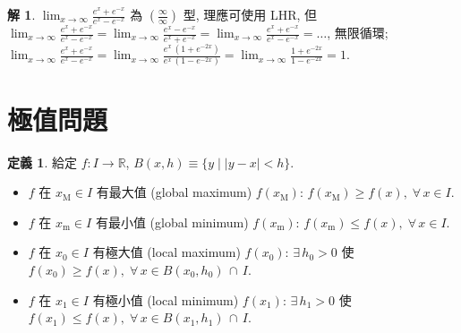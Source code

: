 \documentclass[12pt,a4paper]{extarticle}
\newcommand{\ds}{\displaystyle}
\theoremstyle{definition}
\newtheorem*{dfn}{定義}
\newtheorem*{sol}{解}
\begin{document}
\begin{sol}
  $\ds\lim_{x\to\infty}\frac{e^x + e^{-x}}{e^x - e^{-x}}$ 為 $(\frac{\infty}{\infty})$ 型, 理應可使用 LHR, 但 $\ds\lim_{x\to\infty}\frac{e^x + e^{-x}}{e^x - e^{-x}} = \ds\lim_{x\to\infty}\frac{e^x - e^{-x}}{e^x + e^{-x}} = \lim_{x\to\infty}\frac{e^x + e^{-x}}{e^x - e^{-x}} = \ldots$, 無限循環; $\ds\lim_{x\to\infty}\frac{e^x + e^{-x}}{e^x - e^{-x}} = \lim_{x\to\infty}\frac{e^x\,(1 + e^{-2x})}{e^x\,(1 - e^{-2x})} = \lim_{x\to\infty}\frac{1 + e^{-2x}}{1 - e^{-2x}} = 1$. 
\end{sol}

\section*{極值問題}

\begin{dfn}
  給定 $f:I\to\mathbb{R}$, $\ds B(x, h)\equiv\{y\;|\;|y - x| < h\}$. 
  \begin{itemize}\setlength\itemsep{0em}
    \item $f$ 在 $\ds x_\text{M}\in I$ 有最大值 (global maximum) $\ds f(x_\text{M})$: $\ds f(x_\text{M})\geqslant f(x),\;\forall\,x\in I$. 
    \item $f$ 在 $\ds x_\text{m}\in I$ 有最小值 (global minimum) $\ds f(x_\text{m})$: $\ds f(x_\text{m})\leqslant f(x),\;\forall\,x\in I$. 
    \item $f$ 在 $\ds x_0\in I$ 有極大值 (local maximum) $\ds f(x_0)$: $\ds\exists\,h_0 > 0$ 使 $\ds f(x_0)\geqslant f(x),\;\forall\,x\in B(x_0, h_0)\,\cap\,I$. 
    \item $f$ 在 $\ds x_1\in I$ 有極小值 (local minimum) $\ds f(x_1)$: $\ds\exists\,h_1 > 0$ 使 $\ds f(x_1)\leqslant f(x),\;\forall\,x\in B(x_1, h_1)\,\cap\,I$. 
  \end{itemize}
\end{dfn}
\end{document}
